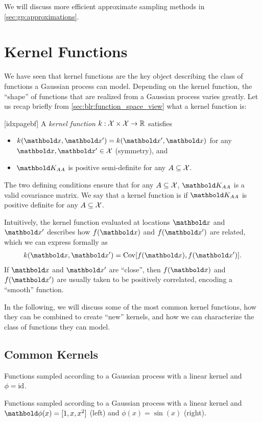 We will discuss more efficient approximate sampling methods in \cref{sec:gp:approximations}.

\section{Kernel Functions}\label{sec:gp:kernel_functions}

We have seen that kernel functions are the key object describing the class of functions a Gaussian process can model.
Depending on the kernel function, the ``shape'' of functions that are realized from a Gaussian process varies greatly.
Let us recap briefly from \cref{sec:blr:function_space_view} what a kernel function is:

\begin{defn}[idxpagebf]
  A \emph{kernel function} $k : \mathcal{X} \times \mathcal{X} \to \mathbb{R}$ satisfies \begin{itemize}
    \item $k(\vx, \vxp) = k(\vxp, \vx)$ for any $\vx, \vxp \in \spX$ (symmetry), and
    \item $\mK_{\sA\sA}$ is positive semi-definite for any $A \subseteq \mathcal{X}$.
  \end{itemize}

  The two defining conditions ensure that for any $A \subseteq \mathcal{X}$, $\mK_{\sA\sA}$ is a valid covariance matrix.
  We say that a kernel function is  if $\mK_{\sA\sA}$ is positive definite for any $A \subseteq \mathcal{X}$.

\end{defn}

Intuitively, the kernel function evaluated at locations $\vx$ and $\vxp$ describes how $f(\vx)$ and $f(\vxp)$ are related, which we can express formally as \begin{align}
  k(\vx, \vxp) = \Cov{f(\vx), f(\vxp)}.
\end{align}
If $\vx$ and $\vxp$ are ``close'', then $f(\vx)$ and $f(\vxp)$ are usually taken to be positively correlated, encoding a ``smooth'' function.


In the following, we will discuss some of the most common kernel functions, how they can be combined to create ``new'' kernels, and how we can characterize the class of functions they can model.

\subsection{Common Kernels}
\begin{marginfigure}
  \caption{Functions sampled according to a Gaussian process with a linear kernel and $\phi = \mathrm{id}$.}
\end{marginfigure}
\begin{marginfigure}
  \caption{Functions sampled according to a Gaussian process with a linear kernel and $\vphi(x) = [1, x, x^2]$ (left) and $\phi(x) = \sin(x)$ (right).}
\end{marginfigure}

